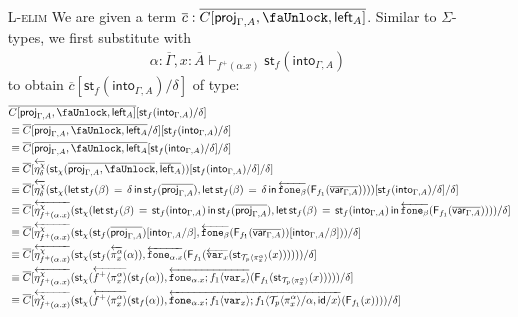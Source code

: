 \documentclass[10pt]{article}
\theoremstyle{definition}
\newcommand{\yields}{\vdash}
\newcommand{\id}{\mathsf{id}}
\newcommand{\rewrite}[2]{\overleftarrow{#1}(#2)}
\newcommand\StI[2]{\ensuremath{\mathsf{st}_{#1}(#2)}}
\newcommand\StE[4]{\ensuremath{\mathsf{let} \, \StI{#1}{#3} \, = \, {#2} \, \mathsf{in} \, #4}}
\newcommand\FIs[2]{\ensuremath{\mathsf{F}_{#1}{(#2)}}}
\newcommand\TrPlus[2]{\ensuremath{{#1}^+(#2)}}
\newcommand\ApEl[2]{\mathcal{T}_{#1}\langle#2\rangle}
\newcommand\ap[2]{\ensuremath{#1 \langle #2 \rangle }}
\newcommand\ApPlus[2]{\ensuremath{{#1}^+ \langle #2 \rangle }}
\newcommand{\upstairs}[1]{\overline{#1}}
\newcommand\proj[1]{\ensuremath{\mathsf{proj}_{#1}}}
\newcommand\qvar[1]{\ensuremath{\mathsf{var}_{#1}}}
\newcommand\into[1]{\ensuremath{\mathsf{into}_{#1}}}
\newcommand\var[1]{\ensuremath{\mathtt{var}_{#1}}}
\newcommand\fone[1]{\ensuremath{\mathtt{fone}_{#1}}}
\newcommand{\lock}{\text{\faUnlock}}
\newcommand{\LI}[1]{\mathsf{left}_{#1}}
\begin{document}
\begin{enumerate}
\item[\textsc{L-elim}] We are given a term $\upstairs{c} : \upstairs{C[\proj{\Gamma, A}, \lock, \LI{A}]}$. Similar to $\Sigma$-types, we first substitute with
\begin{align*}
\alpha : \upstairs{\Gamma}, x : \upstairs{A} \yields_{\TrPlus{f}{\alpha.x}} \StI{f}{\into{\Gamma, A}}
\end{align*}
to obtain $\upstairs{c}[\StI{f}{\into{\Gamma, A}}/\delta]$ of type:
\begin{align*}
&\upstairs{C[\proj{\Gamma, A}, \lock, \LI{A}]}[\StI{f}{\into{\Gamma, A}}/\delta] \\
&\equiv \upstairs{C}[\upstairs{\proj{\Gamma, A}, \lock, \LI{A}}/\delta][\StI{f}{\into{\Gamma, A}}/\delta] \\
&\equiv \upstairs{C}[\upstairs{\proj{\Gamma, A}, \lock, \LI{A}}[\StI{f}{\into{\Gamma, A}}/\delta]/\delta] \\
&\equiv \upstairs{C}[\rewrite{\eta^\chi_\delta}{\StI{\chi}{\upstairs{\proj{\Gamma, A}, \lock}, \upstairs{\LI{A}}}}[\StI{f}{\into{\Gamma, A}}/\delta]/\delta] \\
&\equiv \upstairs{C}[\rewrite{\eta^\chi_\delta}{\StI{\chi}{\StE{f}{\delta}{\beta}{\StI{f}{\upstairs{\proj{\Gamma, A}}}}, \StE{f}{\delta}{\beta}{\rewrite{\fone{\beta}}{\FIs{f_1}{\upstairs{\qvar{\Gamma, A}}}}}}}[\StI{f}{\into{\Gamma, A}}/\delta]/\delta] \\
&\equiv \upstairs{C}[\rewrite{\eta^\chi_{\TrPlus{f}{\alpha.x}}}{\StI{\chi}{\StE{f}{\StI{f}{\into{\Gamma, A}}}{\beta}{\StI{f}{\upstairs{\proj{\Gamma, A}}}}, \StE{f}{\StI{f}{\into{\Gamma, A}}}{\beta}{\rewrite{\fone{\beta}}{\FIs{f_1}{\upstairs{\qvar{\Gamma, A}}}}}}}/\delta] \\
&\equiv \upstairs{C}[\rewrite{\eta^\chi_{\TrPlus{f}{\alpha.x}}}{\StI{\chi}{\StI{f}{\upstairs{\proj{\Gamma, A}}}[\into{\Gamma, A}/\beta], \rewrite{\fone{\beta}}{\FIs{f_1}{\upstairs{\qvar{\Gamma, A}}}}[\into{\Gamma, A}/\beta]}}/\delta] \\
&\equiv \upstairs{C}[\rewrite{\eta^\chi_{\TrPlus{f}{\alpha.x}}}{\StI{\chi}{\StI{f}{\rewrite{\pi^\alpha_x}{\alpha}}, \rewrite{\fone{\alpha.x}}{\FIs{f_1}{\rewrite{\var{x}}{\StI{\ApEl{p}{\pi^\alpha_x}}{x}}}}}}/\delta] \\
&\equiv \upstairs{C}[\rewrite{\eta^\chi_{\TrPlus{f}{\alpha.x}}}{\StI{\chi}{\rewrite{\ApPlus{f}{\pi^\alpha_x}}{\StI{f}{\alpha}}, \rewrite{\fone{\alpha.x};\ap{f_1}{\var{x}}}{\FIs{f_1}{\StI{\ApEl{p}{\pi^\alpha_x}}{x}}}}}/\delta] \\
&\equiv \upstairs{C}[\rewrite{\eta^\chi_{\TrPlus{f}{\alpha.x}}}{\StI{\chi}{\rewrite{\ApPlus{f}{\pi^\alpha_x}}{\StI{f}{\alpha}}, \rewrite{\fone{\alpha.x};\ap{f_1}{\var{x}};\ap{f_1}{\ApEl{p}{\pi^\alpha_x}/\alpha, \id / x}}{\FIs{f_1}{x}}}}/\delta] \\

\end{align*}
\end{enumerate}
\end{document}
